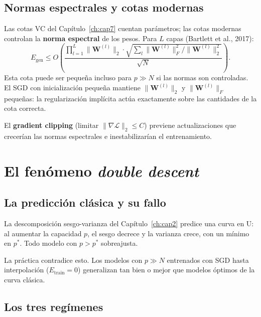 \subsection{Normas espectrales y cotas modernas}
\label{subsec:normas_espectrales}

Las cotas VC del Capítulo~\ref{ch:cap7} cuentan parámetros; las cotas
modernas controlan la \textbf{norma espectral} de los pesos. Para $L$
capas (Bartlett et al., 2017):
\begin{equation}
  E_{\text{gen}} \leq O\!\left(
  \frac{\prod_{l=1}^L\|\bm{W}^{(l)}\|_2 \cdot
  \sqrt{\sum_l\|\bm{W}^{(l)}\|_F^2/\|\bm{W}^{(l)}\|_2^2}}
  {\sqrt{N}}\right).
  \label{eq:bartlett}
\end{equation}
Esta cota puede ser pequeña incluso para $p \gg N$ si las normas son
controladas. El SGD con inicialización pequeña mantiene
$\|\bm{W}^{(l)}\|_2$ y $\|\bm{W}^{(l)}\|_F$ pequeñas: la
regularización implícita actúa exactamente sobre las cantidades de la
cota correcta.

El \textbf{gradient clipping} (limitar
$\|\nabla\mathcal{L}\|_2 \leq C$) previene actualizaciones que
crecerían las normas espectrales e inestabilizarían el entrenamiento.

\section{El fenómeno \textit{double descent}}
\label{sec:double_descent}


\subsection{La predicción clásica y su fallo}
\label{subsec:pred_clasica}

La descomposición sesgo-varianza del Capítulo~\ref{ch:cap2} predice una
curva en U: al aumentar la capacidad $p$, el sesgo decrece y la varianza
crece, con un mínimo en $p^*$. Todo modelo con $p > p^*$ sobreajusta.

La práctica contradice esto. Los modelos con $p \gg N$ entrenados con SGD
hasta interpolación ($E_{\text{train}} = 0$) generalizan tan bien o
mejor que modelos óptimos de la curva clásica.

\subsection{Los tres regímenes}
\label{subsec:tres_regimenes}

